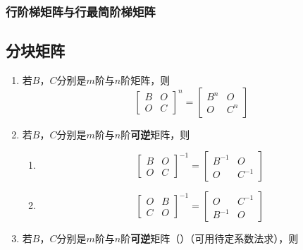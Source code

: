 \documentclass[./linear_algebra.tex]{subfiles}
\begin{document}
    \subsubsection{行阶梯矩阵与行最简阶梯矩阵}

    \subsection{分块矩阵}

    \begin{enumerate}
        \item 若$B$，$C$分别是$m$阶与$n$阶矩阵，则
        \[
            \begin{bmatrix}
                B & O \\
                O & C
            \end{bmatrix}^n
            = \begin{bmatrix}
                  B^n & O   \\
                  O   & C^n
            \end{bmatrix}
        \]
        \item 若$B$，$C$分别是$m$阶与$n$阶\textbf{可逆}矩阵，则
        \begin{enumerate}
            \item
            \[
                \begin{bmatrix}
                    B & O \\
                    O & C
                \end{bmatrix}^{-1}
                = \begin{bmatrix}
                      B^{-1} & O      \\
                      O      & C^{-1}
                \end{bmatrix}
            \]
            \item
            \[
                \begin{bmatrix}
                    O & B \\
                    C & O
                \end{bmatrix}^{-1}
                = \begin{bmatrix}
                      O      & C^{-1} \\
                      B^{-1} & O
                \end{bmatrix}
            \]
        \end{enumerate}
        \item 若$B$，$C$分别是$m$阶与$n$阶\textbf{可逆}矩阵（{\color{red}{左乘同行右乘同列再填负号}}）（可用待定系数法求），则

\end{enumerate}
\end{document}
